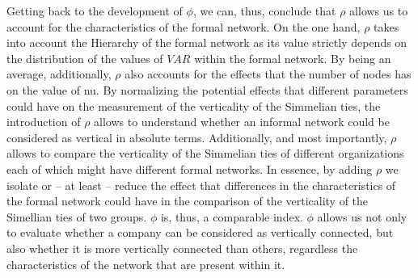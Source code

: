 \documentclass{article}
\begin{document}
Getting back to the development of $\phi$, we can, thus, conclude that $\rho$ allows us to account for the characteristics of the formal network. On the one hand, $\rho$ takes into account the Hierarchy of the formal network as its value strictly depends on the distribution of the values of $VAR$ within the formal network. By being an average, additionally, $\rho$ also accounts for the effects that the number of nodes has on the value of nu. By normalizing the potential effects that different parameters could have on the measurement of the verticality of the Simmelian ties, the introduction of $\rho$ allows to understand whether an informal network could be considered as vertical in absolute terms. Additionally, and most importantly, $\rho$ allows to compare the verticality of the Simmelian ties of different organizations each of which might have different formal networks. In essence, by adding $\rho$ we isolate or – at least – reduce the effect that differences in the characteristics of the formal network could have in the comparison of the verticality of the Simellian ties of two groups. $\phi$ is, thus, a comparable index.
$\phi$ allows us not only to evaluate whether a company can be considered as vertically connected, but also whether it is more vertically connected than others, regardless the characteristics of the network that are present within it.



\newpage
\end{document}
